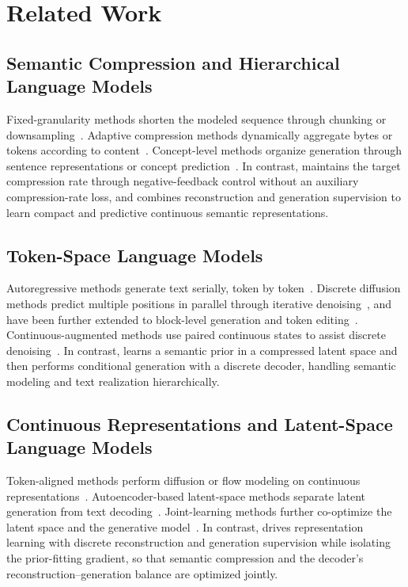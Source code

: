 \section{Related Work}
\label{sec:related}

\subsection{Semantic Compression and Hierarchical Language Models}

Fixed-granularity methods shorten the modeled sequence through chunking or downsampling~\citep{nawrot2022hierarchical,yu2023megabyte}. Adaptive compression methods dynamically aggregate bytes or tokens according to content~\citep{pagnoni2025byte,hwang2026dynamic,qu2025dynamic}. Concept-level methods organize generation through sentence representations or concept prediction~\citep{barrault2024large,cao2026ncp}. In contrast, \method maintains the target compression rate through negative-feedback control without an auxiliary compression-rate loss, and combines reconstruction and generation supervision to learn compact and predictive continuous semantic representations.

\subsection{Token-Space Language Models}

Autoregressive methods generate text serially, token by token~\citep{brown2020language,grattafiori2024llama,yang2025qwen3}. Discrete diffusion methods predict multiple positions in parallel through iterative denoising~\citep{austin2021structured,lou2023discrete,sahoo2024simple,nie2026large,ye2508dream,sahoo2025diffusion}, and have been further extended to block-level generation and token editing~\citep{arriola2025block,bie2025llada2,bie2026llada2}. Continuous-augmented methods use paired continuous states to assist discrete denoising~\citep{zheng2026continuously,zhou2025coevolutionary,uziel2026crocodil}. In contrast, \method learns a semantic prior in a compressed latent space and then performs conditional generation with a discrete decoder, handling semantic modeling and text realization hierarchically.

\subsection{Continuous Representations and Latent-Space Language Models}

Token-aligned methods perform diffusion or flow modeling on continuous representations~\citep{li2022diffusion,gong2022diffuseq,gulrajani2023likelihood,chen2026langflow,yang2026continuous,lee2026flow,hu2026elf}. Autoencoder-based latent-space methods separate latent generation from text decoding~\citep{lovelace2023latent,zhang2023planner,meshchaninov2026cosmos}. Joint-learning methods further co-optimize the latent space and the generative model~\citep{guo2026continuous,meshchaninov2026train}. In contrast, \method drives representation learning with discrete reconstruction and generation supervision while isolating the prior-fitting gradient, so that semantic compression and the decoder's reconstruction--generation balance are optimized jointly.
